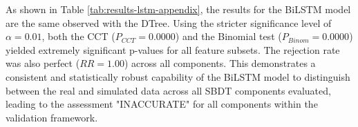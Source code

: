 \begin{appendices}
  As shown in Table \ref{tab:results-lstm-appendix}, the results for the BiLSTM model are the same observed with the DTree. Using the stricter significance level of $\alpha=0.01$, both the CCT ($P_{CCT}=0.0000$) and the Binomial test ($P_{Binom}=0.0000$) yielded extremely significant p-values for all feature subsets. The rejection rate was also perfect ($RR=1.00$) across all components. This demonstrates a consistent and statistically robust capability of the BiLSTM model to distinguish between the real and simulated data across all SBDT components evaluated, leading to the assessment "INACCURATE" for all components within the validation framework.

\end{appendices}